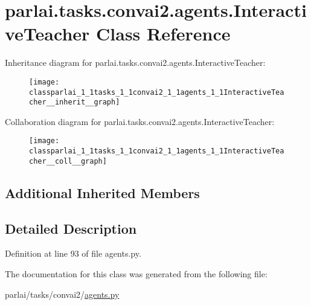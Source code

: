 \hypertarget{classparlai_1_1tasks_1_1convai2_1_1agents_1_1InteractiveTeacher}{}\section{parlai.\+tasks.\+convai2.\+agents.\+Interactive\+Teacher Class Reference}
\label{classparlai_1_1tasks_1_1convai2_1_1agents_1_1InteractiveTeacher}


Inheritance diagram for parlai.\+tasks.\+convai2.\+agents.\+Interactive\+Teacher\+:
\nopagebreak
\begin{figure}[H]
\begin{center}
\leavevmode
\texttt{[image: classparlai\_1\_1tasks\_1\_1convai2\_1\_1agents\_1\_1InteractiveTeacher\_\_inherit\_\_graph]}
\end{center}
\end{figure}


Collaboration diagram for parlai.\+tasks.\+convai2.\+agents.\+Interactive\+Teacher\+:
\nopagebreak
\begin{figure}[H]
\begin{center}
\leavevmode
\texttt{[image: classparlai\_1\_1tasks\_1\_1convai2\_1\_1agents\_1\_1InteractiveTeacher\_\_coll\_\_graph]}
\end{center}
\end{figure}
\subsection*{Additional Inherited Members}


\subsection{Detailed Description}


Definition at line 93 of file agents.\+py.



The documentation for this class was generated from the following file\+:\begin{DoxyCompactItemize}
\item 
parlai/tasks/convai2/\hyperlink{parlai_2tasks_2convai2_2agents_8py}{agents.\+py}\end{DoxyCompactItemize}
